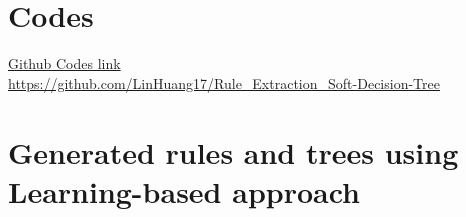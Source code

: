 \documentclass[12pt]{article}%
\begin{document}
\clearpage



\clearpage
\begin{appendix}  
\section{Codes}
\href{https://github.com/LinHuang17/Rule_Extraction_Soft-Decision-Tree}{Github Codes link} \\
\url{https://github.com/LinHuang17/Rule_Extraction_Soft-Decision-Tree}
\section{Generated rules and trees using Learning-based approach }  


\end{appendix}  
\end{document}
